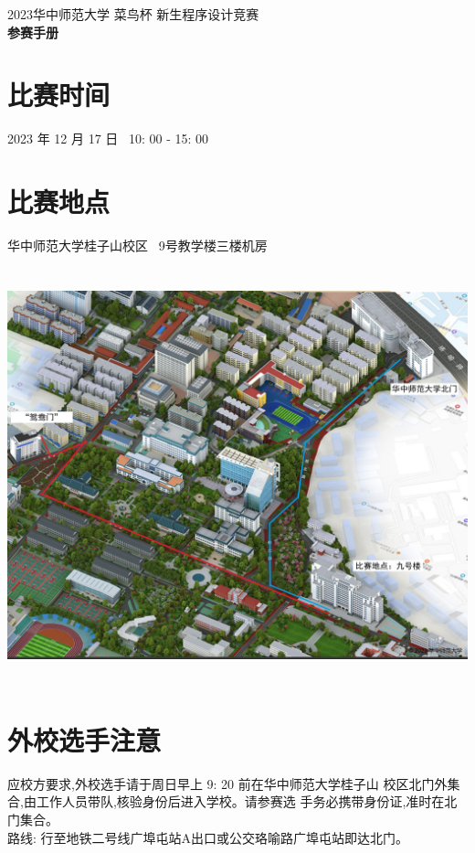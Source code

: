 \documentclass[12pt, a4paper, oneside]{ctexart}
\begin{document}
  \begin{center}
    \textsc{\Large{2023华中师范大学 菜鸟杯 新生程序设计竞赛\\}}
    \fontsize{10mm}{7mm}\selectfont
    \textbf{\Large{参赛手册\\
    }}
  \end{center}

  \section{比赛时间}
  2023 年 12 月 17 日 \ 10: 00 - 15: 00
  \section{比赛地点}
  华中师范大学桂子山校区 \  9号教学楼三楼机房
  
  \begin{center}
    \includegraphics[height=12cm]{route.jpg}
  \end{center}
  
  \section{外校选手注意}
  应校方要求,外校选手请于周日早上 9: 20 前在华中师范大学桂子山
  校区北门外集合,由工作人员带队,核验身份后进入学校。请参赛选
  手务必携带身份证,准时在北门集合。\\
  路线: 行至地铁二号线广埠屯站A出口或公交珞喻路广埠屯站即达北门。
\end{document}
